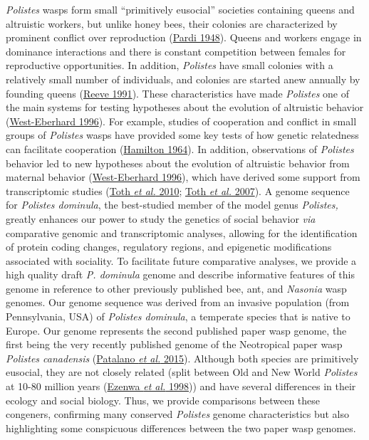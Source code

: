 \textit{Polistes} wasps form small ``primitively eusocial'' societies
containing queens and altruistic workers, but unlike honey bees, their
colonies are characterized by prominent conflict over reproduction
(\protect\hyperlink{ux5fENREFux5f41}{Pardi 1948}). Queens and workers
engage in dominance interactions and there is constant competition
between females for reproductive opportunities. In addition,
\textit{Polistes} have small colonies with a relatively small number of
individuals, and colonies are started anew annually by founding queens
(\protect\hyperlink{ux5fENREFux5f46}{Reeve 1991}). These characteristics
have made \textit{Polistes} one of the main systems for testing hypotheses
about the evolution of altruistic behavior
(\protect\hyperlink{ux5fENREFux5f71}{West-Eberhard 1996}). For example,
studies of cooperation and conflict in small groups of \textit{Polistes}
wasps have provided some key tests of how genetic relatedness can
facilitate cooperation (\protect\hyperlink{ux5fENREFux5f17}{Hamilton
1964}). In addition, observations of \textit{Polistes} behavior led to new
hypotheses about the evolution of altruistic behavior from maternal
behavior (\protect\hyperlink{ux5fENREFux5f71}{West-Eberhard 1996}),
which have derived some support from transcriptomic studies
(\protect\hyperlink{ux5fENREFux5f62}{Toth \textit{et al.} 2010};
\protect\hyperlink{ux5fENREFux5f63}{Toth \textit{et al.} 2007}). A genome
sequence for \textit{Polistes dominula}, the best-studied member of the
model genus \textit{Polistes,} greatly enhances our power to study the
genetics of social behavior \textit{via} comparative genomic and
transcriptomic analyses, allowing for the identification of protein
coding changes, regulatory regions, and epigenetic modifications
associated with sociality. To facilitate future comparative analyses, we
provide a high quality draft \textit{P. dominula} genome and describe
informative features of this genome in reference to other previously
published bee, ant, and \textit{Nasonia} wasp genomes. Our genome sequence
was derived from an invasive population (from Pennsylvania, USA) of
\textit{Polistes dominula}, a temperate species that is native to Europe.
Our genome represents the second published paper wasp genome, the first
being the very recently published genome of the Neotropical paper wasp
\textit{Polistes canadensis} (\protect\hyperlink{ux5fENREFux5f43}{Patalano
\textit{et al.} 2015}). Although both species are primitively eusocial,
they are not closely related (split between Old and New World
\textit{Polistes} at 10-80 million years
(\protect\hyperlink{ux5fENREFux5f9}{Ezenwa \textit{et al.} 1998})) and
have several differences in their ecology and social biology. Thus, we
provide comparisons between these congeners, confirming many conserved
\textit{Polistes} genome characteristics but also highlighting some
conspicuous differences between the two paper wasp genomes.

